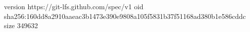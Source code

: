 version https://git-lfs.github.com/spec/v1
oid sha256:160dd8a2910aaeac3b1473e390e9808a105f5831b37f51168ad380b1e586cddc
size 349632
